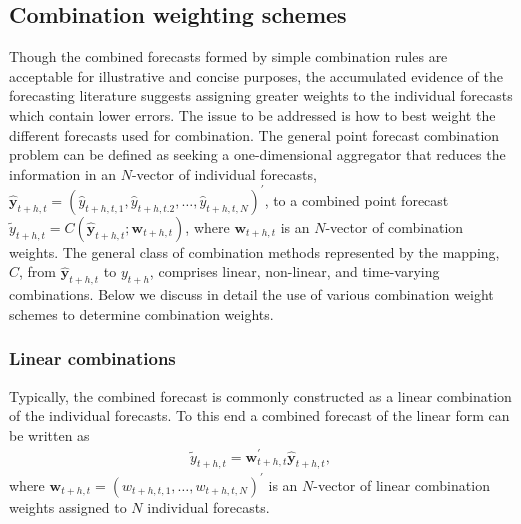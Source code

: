 \documentclass[11pt]{article}
\begin{document}
\subsection{Combination weighting schemes}



Though the combined forecasts formed by simple combination rules are acceptable for illustrative and concise purposes, the accumulated evidence of the forecasting literature suggests assigning greater weights to the individual forecasts which contain lower errors. The issue to be addressed is how to best weight the different forecasts used for combination. The general point forecast combination problem can be defined as seeking a one-dimensional aggregator that reduces the information in an $N$-vector of individual forecasts, $\hat{\mathbf{y}}_{t+h, t}=\left(\hat{y}_{t+h, t, 1}, \hat{y}_{t+h, t .2}, \ldots, \hat{y}_{t+h, t, N}\right)^{\prime}$, to a combined point forecast $\tilde{y}_{t+h, t}=C\left(\hat{\mathbf{y}}_{t+h, t} ; \boldsymbol{w}_{t+h, t}\right)$, where $\boldsymbol{w}_{t+h, t}$ is an $N$-vector of combination weights. The general class of combination methods represented by the mapping, $C$, from $\hat{\mathbf{y}}_{t+h, t}$ to $y_{t+h}$, comprises linear, non-linear, and time-varying combinations. Below we discuss in detail the use of various combination weight schemes to determine combination weights.

\subsubsection{Linear combinations}

Typically, the combined forecast is commonly constructed as a linear combination of the individual forecasts. To this end a combined forecast of the linear form can be written as
\begin{align}
\label{eq:linear-combinations}
\tilde{y}_{t+h, t}=\boldsymbol{w}_{t+h, t}^{\prime} \hat{\mathbf{y}}_{t+h, t},
\end{align}
where $\boldsymbol{w}_{t+h, t}=\left(w_{t+h, t, 1}, \ldots, w_{t+h, t, N}\right)^{\prime}$ is an $N$-vector of linear combination weights assigned to $N$ individual forecasts.
\end{document}
